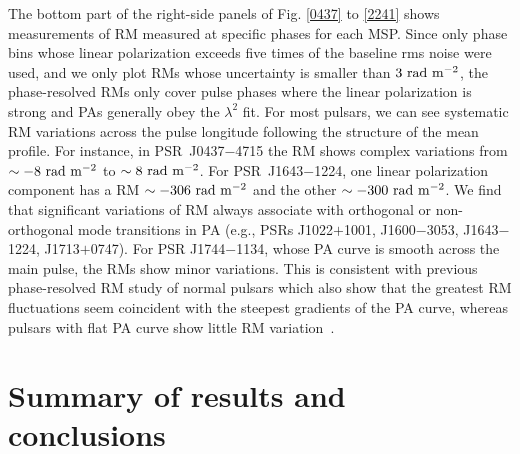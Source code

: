 \documentclass[useAMS,usenatbib]{mn2e}
\begin{document}

The bottom part of the right-side panels of Fig. \ref{0437} to \ref{2241} shows measurements of RM measured at specific phases for each MSP.
%
Since only phase bins whose linear polarization exceeds five times of the baseline 
rms noise were used, and we only plot RMs whose uncertainty is smaller than $3\ \rm{rad\ m^{-2}}$,
the phase-resolved RMs only cover pulse phases where the linear polarization is 
strong and PAs generally obey the $\lambda^2$ fit.
%
For most pulsars, we can see systematic RM variations across the pulse longitude following the 
structure of the mean profile.
%
For instance, in PSR~J0437$-$4715 the RM shows complex variations from $\sim -8\ \rm{rad\ m^{-2}}$ 
to $\sim 8\ \rm{rad\ m^{-2}}$. For PSR~J1643$-$1224, one linear polarization component has 
a RM $\sim -306\ \rm{rad\ m^{-2}}$ and the other $\sim -300\ \rm{rad\ m^{-2}}$. 
%
We find that significant variations of RM always associate with orthogonal or non-orthogonal mode 
transitions in PA (e.g., PSRs J1022$+$1001, J1600$-$3053, J1643$-$1224, J1713$+$0747).
%
For PSR J1744$-$1134, whose PA curve is smooth across the main pulse, the RMs show minor 
variations.
%
This is consistent with previous phase-resolved RM study of normal pulsars which also show 
that the greatest RM fluctuations seem coincident with the steepest gradients of the PA 
curve, whereas pulsars with flat PA curve show little RM variation~\citep{Noutsos09}.

\section{Summary of results and conclusions}
\end{document}
